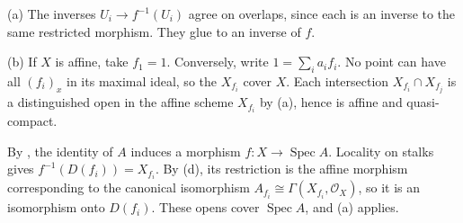 (a) The inverses $U_i\to f^{-1}(U_i)$ agree on overlaps, since each is an inverse to the same restricted morphism. They glue to an inverse of $f$.

(b) If $X$ is affine, take $f_1=1$. Conversely, write $1=\sum_i a_if_i$. No point can have all $(f_i)_x$ in its maximal ideal, so the $X_{f_i}$ cover $X$. Each intersection $X_{f_i}\cap X_{f_j}$ is a distinguished open in the affine scheme $X_{f_i}$ by (a), hence is affine and quasi-compact.

By , the identity of $A$ induces a morphism $f:X\to\operatorname{Spec}A$. Locality on stalks gives $f^{-1}(D(f_i))=X_{f_i}$. By (d), its restriction is the affine morphism corresponding to the canonical isomorphism $A_{f_i}\cong\Gamma(X_{f_i},\mathcal O_X)$, so it is an isomorphism onto $D(f_i)$. These opens cover $\operatorname{Spec}A$, and (a) applies.
